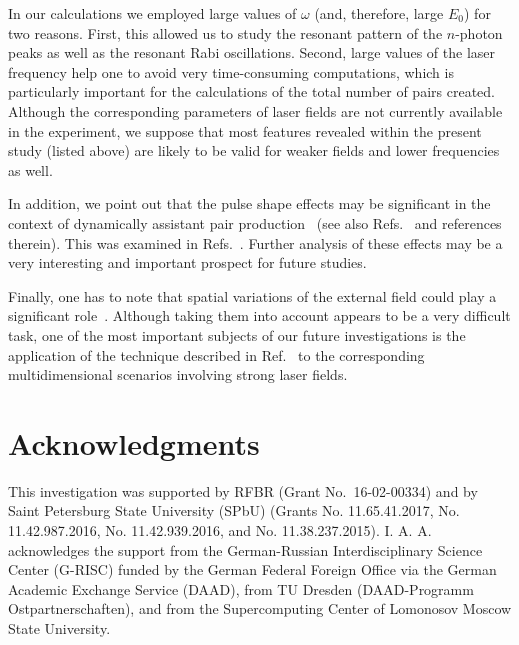 \documentclass[preprint,aps,prd,showpacs,floatfix]{revtex4-1}
\begin{document}
\indent In our calculations we employed large values of $\omega$ (and, therefore, large $E_0$) for two reasons. First, this allowed us to study the resonant pattern of the $n$-photon peaks as well as the resonant Rabi oscillations. Second, large values of the laser frequency help one to avoid very time-consuming computations, which is particularly important for the calculations of the total number of pairs created. Although the corresponding parameters of laser fields are not currently available in the experiment, we suppose that most features revealed within the present study (listed above) are likely to be valid for weaker fields and lower frequencies as well.

\indent In addition, we point out that the pulse shape effects may be significant in the context of dynamically assistant pair production~\cite{schutzhold_prl_2008} (see also Refs.~\cite{akal_prd_2014, otto_plb_2015} and references therein). This was examined in Refs.~\cite{linder_prd_2015, hebenstreit_plb_2014, nuriman_plb_2012, kohlfuerst_prd_2013}. Further analysis of these effects may be a very interesting and important prospect for future studies.

\indent Finally, one has to note that spatial variations of the external field could play a significant role~\cite{hebenstreit_prl_2011, hebenstreit_prd_2010, ruf_prl_2009, woellert_prd_2015, aleksandrov_prd_2016}. Although taking them into account appears to be a very difficult task, one of the most important subjects of our future investigations is the application of the technique described in Ref.~\cite{aleksandrov_prd_2016} to the corresponding multidimensional scenarios involving strong laser fields.
\section*{Acknowledgments}
%
This investigation was supported by RFBR (Grant No.~16-02-00334) and by Saint Petersburg State University (SPbU) (Grants No. 11.65.41.2017, No. 11.42.987.2016, No. 11.42.939.2016, and No. 11.38.237.2015). I. A. A. acknowledges the support from the German-Russian Interdisciplinary Science Center (G-RISC) funded by the German Federal Foreign Office via the German Academic Exchange Service (DAAD), from TU Dresden (DAAD-Programm Ostpartnerschaften), and from the Supercomputing Center of Lomonosov Moscow State University.
\appendix
\end{document}

